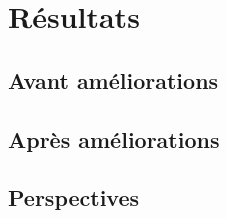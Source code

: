 \chapter{Résultats}
    \section{Avant améliorations}
    \section{Après améliorations}
    \section{Perspectives}
